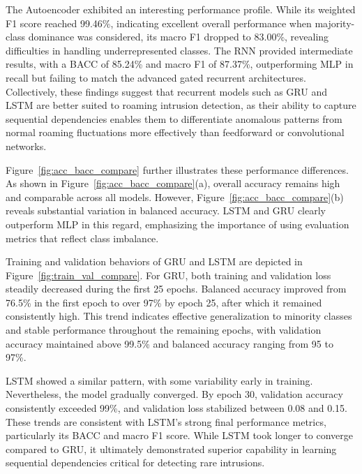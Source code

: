 \documentclass[journal,article,submit,moreauthors,pdftex]{Definitions/tsp}
\begin{document}
The Autoencoder exhibited an interesting performance profile. While its weighted F1 score reached 99.46\%, indicating excellent overall performance when majority-class dominance was considered, its macro F1 dropped to 83.00\%, revealing difficulties in handling underrepresented classes. The RNN provided intermediate results, with a BACC of 85.24\% and macro F1 of 87.37\%, outperforming MLP in recall but failing to match the advanced gated recurrent architectures. Collectively, these findings suggest that recurrent models such as GRU and LSTM are better suited to roaming intrusion detection, as their ability to capture sequential dependencies enables them to differentiate anomalous patterns from normal roaming fluctuations more effectively than feedforward or convolutional networks.

Figure~\ref{fig:acc_bacc_compare} further illustrates these performance differences. As shown in Figure~\ref{fig:acc_bacc_compare}(a), overall accuracy remains high and comparable across all models. However, Figure~\ref{fig:acc_bacc_compare}(b) reveals substantial variation in balanced accuracy. LSTM and GRU clearly outperform MLP in this regard, emphasizing the importance of using evaluation metrics that reflect class imbalance.

Training and validation behaviors of GRU and LSTM are depicted in Figure~\ref{fig:train_val_compare}. For GRU, both training and validation loss steadily decreased during the first 25 epochs. Balanced accuracy improved from 76.5\% in the first epoch to over 97\% by epoch 25, after which it remained consistently high. This trend indicates effective generalization to minority classes and stable performance throughout the remaining epochs, with validation accuracy maintained above 99.5\% and balanced accuracy ranging from 95 to 97\%.

LSTM showed a similar pattern, with some variability early in training. Nevertheless, the model gradually converged. By epoch 30, validation accuracy consistently exceeded 99\%, and validation loss stabilized between 0.08 and 0.15. These trends are consistent with LSTM’s strong final performance metrics, particularly its BACC and macro F1 score. While LSTM took longer to converge compared to GRU, it ultimately demonstrated superior capability in learning sequential dependencies critical for detecting rare intrusions.
\end{document}
